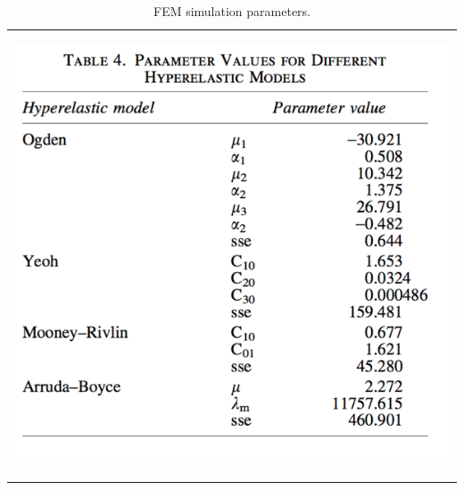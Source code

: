 \documentclass[journal,onecolumn]{IEEEtran}
\begin{document}
\begin{itemize}
\begin{table}[!p]
\caption{\label{tab:org0f1e665}
FEM simulation parameters.}
\centering
\begin{tabular}{p{}}
\begin{center}
\includegraphics[width=.9\linewidth]{./fig/tab2.png}
\end{center}\\
\end{tabular}
\end{table}
\end{itemize}
\end{document}
